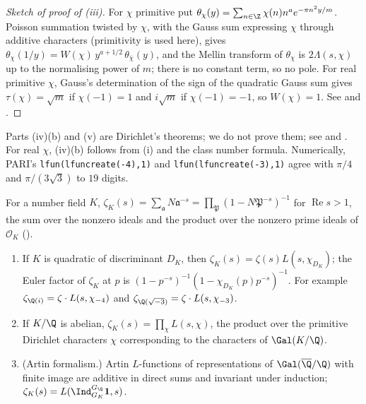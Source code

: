 \begin{proof}[Sketch of proof of (iii)]
For $\chi$ primitive put $\theta_\chi(y)=\sum_{n\in\Z}\chi(n)n^ae^{-\pi n^2y/m}$. Poisson summation twisted by $\chi$, with the Gauss sum expressing $\chi$ through additive
characters (primitivity is used here), gives $\theta_\chi(1/y)=W(\chi)\,y^{a+1/2}\,\theta_{\bar\chi}(y)$, and the Mellin transform of $\theta_\chi$ is $2\Lambda(s,\chi)$ up to
the normalising power of $m$; there is no constant term, so no pole. For real primitive $\chi$, Gauss's determination of the sign of the quadratic Gauss
sum gives $\tau(\chi)=\sqrt m$ if $\chi(-1)=1$ and $i\sqrt m$ if $\chi(-1)=-1$, so $W(\chi)=1$. See \cite{Davenport00} and \cite[Chapter 4]{Washington}.
\end{proof}

Parts (iv)(b) and (v) are Dirichlet's theorems; we do not prove them; see \cite[Chapter VI]{SerreCourse} and \cite{Davenport00}. For real $\chi$, (iv)(b) follows from
(i) and the class number formula. Numerically, PARI's \texttt{lfun(lfuncreate(-4),1)} and \texttt{lfun(lfuncreate(-3),1)} agree with
$\pi/4$ and $\pi/(3\sqrt3)$ to $19$ digits.

\begin{theorem}\label{thm:lfunctions:dedekind}
For a number field $K$, $\zeta_K(s)=\sum_{\mathfrak a}N\mathfrak a^{-s}=\prod_{\mathfrak P}(1-N\mathfrak P^{-s})^{-1}$ for $\operatorname{Re}s>1$, the sum over the nonzero ideals and the
product over the nonzero prime ideals of $\mathcal O_K$ ().
\begin{enumerate}[label=(\roman*)]
\item If $K$ is quadratic of discriminant $D_K$, then $\zeta_K(s)=\zeta(s)L(s,\chi_{D_K})$; the Euler factor of $\zeta_K$ at $p$ is $(1-p^{-s})^{-1}(1-\chi_{D_K}(p)p^{-s})^{-1}$. For
example $\zeta_{\Q(i)}=\zeta\cdot L(s,\chi_{-4})$ and $\zeta_{\Q(\sqrt{-3})}=\zeta\cdot L(s,\chi_{-3})$.
\item If $K/\Q$ is abelian, $\zeta_K(s)=\prod_\chi L(s,\chi)$, the product over the primitive Dirichlet characters $\chi$ corresponding to the characters of $\Gal(K/\Q)$.
\item (Artin formalism.) Artin $L$-functions of representations of $\Gal(\overline\Q/\Q)$ with finite image are additive in direct sums and invariant under induction;
$\zeta_K(s)=L(\Ind_{G_K}^{G_\Q}\mathbf 1,s)$.
\end{enumerate}
\end{theorem}

